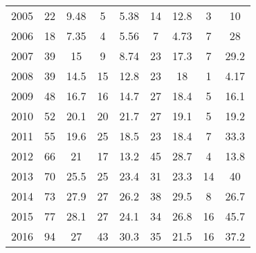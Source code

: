 \begin{table}[htbp]
\begin{tabular}{l*{8}{c}}
2005      &       22&     9.48&        5&     5.38&       14&     12.8&        3&       10\\
2006      &       18&     7.35&        4&     5.56&        7&     4.73&        7&       28\\
2007      &       39&       15&        9&     8.74&       23&     17.3&        7&     29.2\\
2008      &       39&     14.5&       15&     12.8&       23&       18&        1&     4.17\\
2009      &       48&     16.7&       16&     14.7&       27&     18.4&        5&     16.1\\
2010      &       52&     20.1&       20&     21.7&       27&     19.1&        5&     19.2\\
2011      &       55&     19.6&       25&     18.5&       23&     18.4&        7&     33.3\\
2012      &       66&       21&       17&     13.2&       45&     28.7&        4&     13.8\\
2013      &       70&     25.5&       25&     23.4&       31&     23.3&       14&       40\\
2014      &       73&     27.9&       27&     26.2&       38&     29.5&        8&     26.7\\
2015      &       77&     28.1&       27&     24.1&       34&     26.8&       16&     45.7\\
2016      &       94&       27&       43&     30.3&       35&     21.5&       16&     37.2\\
\hline\hline
\end{tabular}
\end{table}

